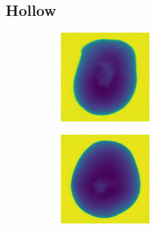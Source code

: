 \documentclass[11pt]{article}
\begin{document}
\subsection{Hollow}

\begin{figure}[!h]
    \captionsetup[subfigure]{labelformat=empty}
     \centering
     \begin{subfigure}[b]{0.22\textwidth}
         \centering
         \includegraphics[width=\textwidth]{figurer/potato_dataset/hollow/hollow_0.jpg}
         \caption{}
         \label{fig:hollow_0}
     \end{subfigure}
     \hfill
     \begin{subfigure}[b]{0.22\textwidth}
         \centering
         \includegraphics[width=\textwidth]{figurer/potato_dataset/hollow/hollow_1.jpg}

\end{subfigure}
\end{figure}
\end{document}

